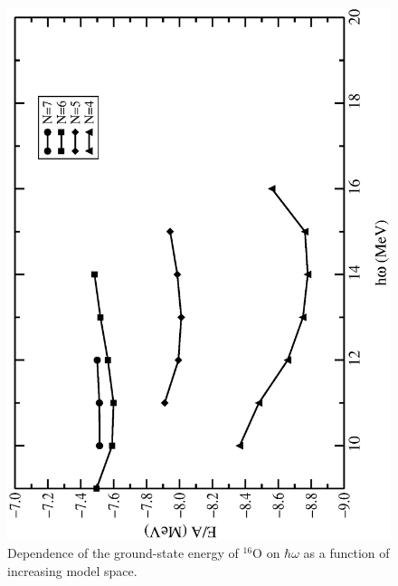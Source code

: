 \documentclass{article}
\begin{document}
\begin{figure}
\begin{center}
\includegraphics[angle=270, scale=0.35]{figure_ccsd_ox.eps}
\caption{Dependence of the ground-state energy of $^{16}$O  on $\hbar\omega$
as a function of increasing model space.}
\label{fig_ox_hw}
\end{center}
\end{figure}
\end{document}
